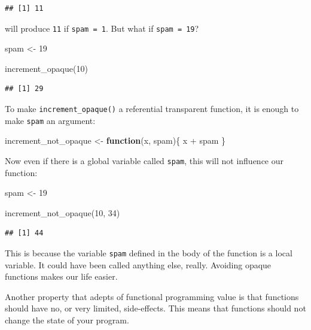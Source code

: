 \documentclass[
]{article}
\newenvironment{Shaded}{\begin{snugshade}}{\end{snugshade}}
\newcommand{\ControlFlowTok}[1]{\textcolor[rgb]{0.13,0.29,0.53}{\textbf{#1}}}
\newcommand{\DecValTok}[1]{\textcolor[rgb]{0.00,0.00,0.81}{#1}}
\newcommand{\FunctionTok}[1]{\textcolor[rgb]{0.00,0.00,0.00}{#1}}
\newcommand{\NormalTok}[1]{#1}
\newcommand{\OtherTok}[1]{\textcolor[rgb]{0.56,0.35,0.01}{#1}}
\newcommand{\SpecialCharTok}[1]{\textcolor[rgb]{0.00,0.00,0.00}{#1}}
\begin{document}
\begin{verbatim}
## [1] 11
\end{verbatim}

will produce \texttt{11} if \texttt{spam\ =\ 1}. But what if \texttt{spam\ =\ 19}?

\begin{Shaded}
\begin{Highlighting}[]
\NormalTok{spam }\OtherTok{\textless{}{-}} \DecValTok{19}

\FunctionTok{increment\_opaque}\NormalTok{(}\DecValTok{10}\NormalTok{)}
\end{Highlighting}
\end{Shaded}

\begin{verbatim}
## [1] 29
\end{verbatim}

To make \texttt{increment\_opaque()} a referential transparent function, it is enough to make \texttt{spam} an
argument:

\begin{Shaded}
\begin{Highlighting}[]
\NormalTok{increment\_not\_opaque }\OtherTok{\textless{}{-}} \ControlFlowTok{function}\NormalTok{(x, spam)\{}
\NormalTok{    x }\SpecialCharTok{+}\NormalTok{ spam}
\NormalTok{\}}
\end{Highlighting}
\end{Shaded}

Now even if there is a global variable called \texttt{spam}, this will not influence our function:

\begin{Shaded}
\begin{Highlighting}[]
\NormalTok{spam }\OtherTok{\textless{}{-}} \DecValTok{19}

\FunctionTok{increment\_not\_opaque}\NormalTok{(}\DecValTok{10}\NormalTok{, }\DecValTok{34}\NormalTok{)}
\end{Highlighting}
\end{Shaded}

\begin{verbatim}
## [1] 44
\end{verbatim}

This is because the variable \texttt{spam} defined in the body of the function is a local variable. It
could have been called anything else, really. Avoiding opaque functions makes our life easier.

Another property that adepts of functional programming value is that functions should have no, or
very limited, side-effects. This means that functions should not change the state of your program.
\end{document}
